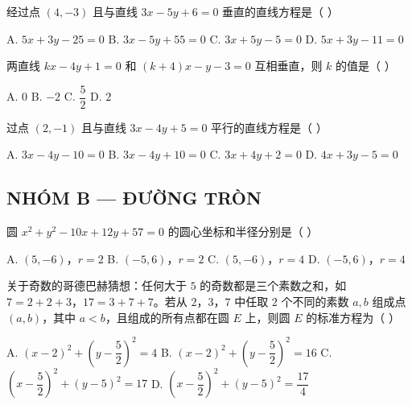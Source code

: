 \documentclass[11pt, a4paper]{article}
\begin{document}
\begin{baitap}[5]
经过点 $(4,-3)$ 且与直线 $3x - 5y + 6 = 0$ 垂直的直线方程是（ ）
\par\vspace{3pt}
\noindent A. $5x + 3y - 25 = 0$ \quad B. $3x - 5y + 55 = 0$ \quad C. $3x + 5y - 5 = 0$ \quad D. $5x + 3y - 11 = 0$
\end{baitap}

\begin{baitap}[6]
两直线 $kx - 4y + 1 = 0$ 和 $(k + 4)x - y - 3 = 0$ 互相垂直，则 $k$ 的值是（ ）
\par\vspace{3pt}
\noindent A. $0$ \quad B. $-2$ \quad C. $\dfrac{5}{2}$ \quad D. $2$
\end{baitap}

\begin{baitap}[7]
过点 $(2,-1)$ 且与直线 $3x - 4y + 5 = 0$ 平行的直线方程是（ ）
\par\vspace{3pt}
\noindent A. $3x - 4y - 10 = 0$ \quad B. $3x - 4y + 10 = 0$ \quad C. $3x + 4y + 2 = 0$ \quad D. $4x + 3y - 5 = 0$
\end{baitap}

\subsection*{NHÓM B — ĐƯỜNG TRÒN}

\begin{baitap}[8]
圆 $x^2 + y^2 - 10x + 12y + 57 = 0$ 的圆心坐标和半径分别是（ ）
\par\vspace{3pt}
\noindent A. $(5,-6)$，$r = 2$ \quad B. $(-5,6)$，$r = 2$ \quad C. $(5,-6)$，$r = 4$ \quad D. $(-5,6)$，$r = 4$
\end{baitap}

\begin{baitap}[9]
关于奇数的哥德巴赫猜想：任何大于 $5$ 的奇数都是三个素数之和，如 $7 = 2 + 2 + 3$，$17 = 3 + 7 + 7$。若从 $2$，$3$，$7$ 中任取 $2$ 个不同的素数 $a, b$ 组成点 $(a, b)$，其中 $a < b$，且组成的所有点都在圆 $E$ 上，则圆 $E$ 的标准方程为（ ）
\par\vspace{3pt}
\noindent A. $(x-2)^2 + \left(y-\dfrac{5}{2}\right)^2 = 4$ \quad B. $(x-2)^2 + \left(y-\dfrac{5}{2}\right)^2 = 16$ \quad C. $\left(x-\dfrac{5}{2}\right)^2 + (y-5)^2 = 17$ \quad D. $\left(x-\dfrac{5}{2}\right)^2 + (y-5)^2 = \dfrac{17}{4}$
\end{baitap}
\end{document}
